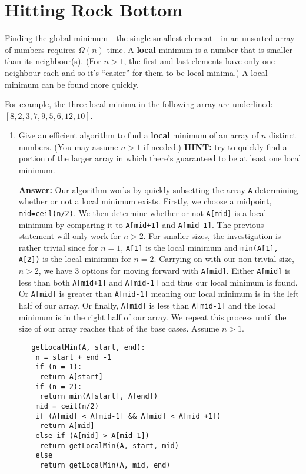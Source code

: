 \documentclass[11pt, oneside]{article}   	%
\theoremstyle{definition}
\theoremstyle{remark}
\begin{document}
\clearpage
\section{Hitting Rock Bottom}
\label{sec-3}

Finding the global minimum---the single smallest element---in an
unsorted array of numbers requires $\Omega(n)$ time.  A \textbf{local}
minimum is a number that is smaller than its neighbour(s). (For $n>1$,
the first and last elements have only one neighbour each and so it's
``easier'' for them to be local minima.) A local minimum can be found
more quickly.

For example, the three local minima in the following array are
underlined: $[8, \underline{2}, 3, 7, 9, \underline{5}, 6, 12,
\underline{10}]$.

\begin{enumerate}
\item Give an efficient algorithm to find a \textbf{local} minimum of an array
   of $n$ distinct numbers. (You may assume $n > 1$ if
   needed.) \textbf{HINT:} try to quickly find a portion of the larger array
   in which there's guaranteed to be at least one local minimum.
   
   \textbf{Answer: }Our algorithm works by quickly subsetting the array \texttt{A} determining whether or not a local minimum exists. Firstly, we choose a midpoint, \texttt{mid=ceil(n/2)}. We then determine whether or not \texttt{A[mid]} is a local minimum by comparing it to \texttt{A[mid+1]} and \texttt{A[mid-1]}. The previous statement will only work for $n > 2$. For smaller sizes, the investigation is rather trivial since for $n=1$, \texttt{A[1]} is the local minimum and \texttt{min(A[1], A[2])}  is the local minimum for $n=2$. Carrying on with our non-trivial size, $n > 2$, we have 3 options for moving forward with \texttt{A[mid]}. Either \texttt{A[mid]} is less than both \texttt{A[mid+1]} and \texttt{A[mid-1]} and thus our local minimum is found. Or \texttt{A[mid]} is greater than \texttt{A[mid-1]} meaning our local minimum is in the left half of our array. Or finally, \texttt{A[mid]} is  less than \texttt{A[mid-1]} and the local minimum is in the right half of our array. We repeat this process until the size of our array reaches that of the base cases. Assume $n>1$.
   \begin{verbatim}
   getLocalMin(A, start, end):
    n = start + end -1
    if (n = 1):
     return A[start]
    if (n = 2):
     return min(A[start], A[end])
    mid = ceil(n/2)
    if (A[mid] < A[mid-1] && A[mid] < A[mid +1])
     return A[mid]
    else if (A[mid] > A[mid-1]) 
     return getLocalMin(A, start, mid)
    else
     return getLocalMin(A, mid, end)
    

\end{verbatim}
\end{enumerate}
\end{document}
